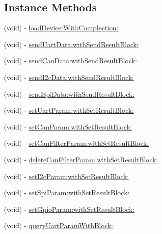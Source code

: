 \subsection*{Instance Methods}
\begin{DoxyCompactItemize}
\item 
(void) -\/ \hyperlink{interface_p_v_mount_controller_a43ef148cab654a129594092645d7ca6e}{load\+Device\+:\+With\+Complection\+:}
\item 
(void) -\/ \hyperlink{interface_p_v_mount_controller_a05517169ff58a8eede7a79241c831a56}{send\+Uart\+Data\+:with\+Send\+Result\+Block\+:}
\item 
(void) -\/ \hyperlink{interface_p_v_mount_controller_a029b6d7c818f6f96f438be8aa473c09f}{send\+Can\+Data\+:with\+Send\+Result\+Block\+:}
\item 
(void) -\/ \hyperlink{interface_p_v_mount_controller_ae335b4ef316509c888934b79978de043}{send\+I2c\+Data\+:with\+Send\+Result\+Block\+:}
\item 
(void) -\/ \hyperlink{interface_p_v_mount_controller_abf965f0757a777c6e6c344f988feaed9}{send\+Spi\+Data\+:with\+Send\+Result\+Block\+:}
\item 
(void) -\/ \hyperlink{interface_p_v_mount_controller_a7aabeac6feb132cbeee4a0d3d0622a37}{set\+Uart\+Param\+:with\+Set\+Result\+Block\+:}
\item 
(void) -\/ \hyperlink{interface_p_v_mount_controller_aebef7ccd20015622ac2723646a5207e5}{set\+Can\+Param\+:with\+Set\+Result\+Block\+:}
\item 
(void) -\/ \hyperlink{interface_p_v_mount_controller_abd9f7b585150882e4cdfc4c33d9fcc69}{set\+Can\+Filter\+Param\+:with\+Set\+Result\+Block\+:}
\item 
(void) -\/ \hyperlink{interface_p_v_mount_controller_aa012204d433eb9b285031bfa90259ae3}{delete\+Can\+Filter\+Param\+:with\+Set\+Result\+Block\+:}
\item 
(void) -\/ \hyperlink{interface_p_v_mount_controller_a750c2e7102443f1561a805722c192e73}{set\+I2c\+Param\+:with\+Set\+Result\+Block\+:}
\item 
(void) -\/ \hyperlink{interface_p_v_mount_controller_acade0baa3de226826dabbc1405fc7d1f}{set\+Spi\+Param\+:with\+Set\+Result\+Block\+:}
\item 
(void) -\/ \hyperlink{interface_p_v_mount_controller_af77e33c83c47ac2ab0fc5068f910cddb}{set\+Gpio\+Param\+:with\+Set\+Result\+Block\+:}
\item 
(void) -\/ \hyperlink{interface_p_v_mount_controller_ae409b6699b65229e0f78253e4b0fe30e}{query\+Uart\+Param\+With\+Block\+:}

\end{DoxyCompactItemize}
